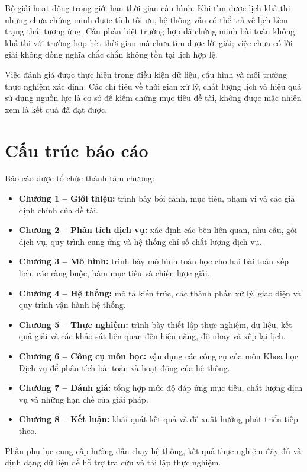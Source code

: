 Bộ giải hoạt động trong giới hạn thời gian cấu hình. Khi tìm được lịch khả thi nhưng chưa chứng minh được tính tối ưu, hệ thống vẫn có thể trả về lịch kèm trạng thái tương ứng. Cần phân biệt trường hợp đã chứng minh bài toán không khả thi với trường hợp hết thời gian mà chưa tìm được lời giải; việc chưa có lời giải không đồng nghĩa chắc chắn không tồn tại lịch hợp lệ.

Việc đánh giá được thực hiện trong điều kiện dữ liệu, cấu hình và môi trường thực nghiệm xác định. Các chỉ tiêu về thời gian xử lý, chất lượng lịch và hiệu quả sử dụng nguồn lực là cơ sở để kiểm chứng mục tiêu đề tài, không được mặc nhiên xem là kết quả đã đạt được.

\section{Cấu trúc báo cáo}
\label{sec:cau-truc}

Báo cáo được tổ chức thành tám chương:
\begin{itemize}
    \item \textbf{Chương 1 -- Giới thiệu:} trình bày bối cảnh, mục tiêu, phạm vi và các giả định chính của đề tài.
    \item \textbf{Chương 2 -- Phân tích dịch vụ:} xác định các bên liên quan, nhu cầu, gói dịch vụ, quy trình cung ứng và hệ thống chỉ số chất lượng dịch vụ.
    \item \textbf{Chương 3 -- Mô hình:} trình bày mô hình toán học cho hai bài toán xếp lịch, các ràng buộc, hàm mục tiêu và chiến lược giải.
    \item \textbf{Chương 4 -- Hệ thống:} mô tả kiến trúc, các thành phần xử lý, giao diện và quy trình vận hành hệ thống.
    \item \textbf{Chương 5 -- Thực nghiệm:} trình bày thiết lập thực nghiệm, dữ liệu, kết quả giải và các khảo sát liên quan đến hiệu năng, độ nhạy và xếp lại lịch.
    \item \textbf{Chương 6 -- Công cụ môn học:} vận dụng các công cụ của môn Khoa học Dịch vụ để phân tích bài toán và hoạt động của hệ thống.
    \item \textbf{Chương 7 -- Đánh giá:} tổng hợp mức độ đáp ứng mục tiêu, chất lượng dịch vụ và những hạn chế của giải pháp.
    \item \textbf{Chương 8 -- Kết luận:} khái quát kết quả và đề xuất hướng phát triển tiếp theo.
\end{itemize}

Phần phụ lục cung cấp hướng dẫn chạy hệ thống, kết quả thực nghiệm đầy đủ và định dạng dữ liệu để hỗ trợ tra cứu và tái lập thực nghiệm.
